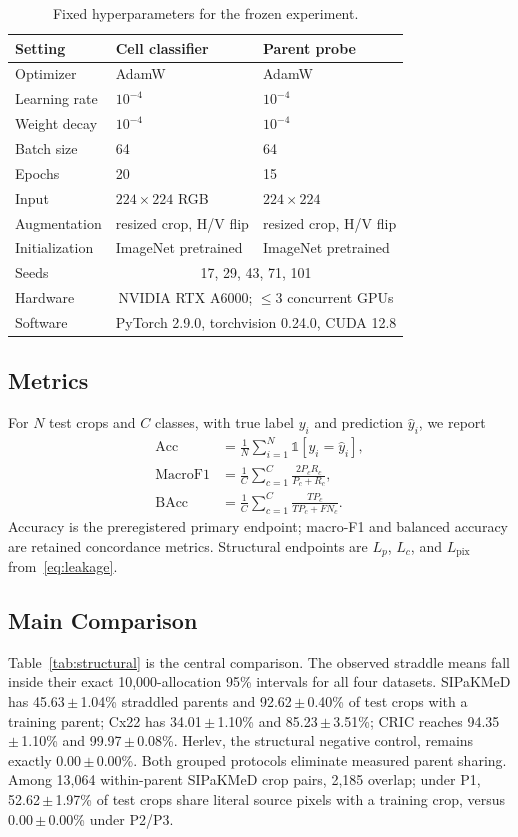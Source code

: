 \documentclass[conference]{IEEEtran}
\newcommand{\meanpm}[2]{#1\,$\pm$\,#2}
\newcommand{\protocol}[1]{\textsf{#1}}
\begin{document}
\begin{table}[t]
\caption{Fixed hyperparameters for the frozen experiment.}
\label{tab:hparams}
\centering
\scriptsize
\setlength{\tabcolsep}{3.5pt}
\begin{tabular}{lll}
\toprule
Setting & Cell classifier & Parent probe \\
\midrule
Optimizer & AdamW & AdamW \\
Learning rate & $10^{-4}$ & $10^{-4}$ \\
Weight decay & $10^{-4}$ & $10^{-4}$ \\
Batch size & 64 & 64 \\
Epochs & 20 & 15 \\
Input & $224\times224$ RGB & $224\times224$ \\
Augmentation & resized crop, H/V flip & resized crop, H/V flip \\
Initialization & ImageNet pretrained & ImageNet pretrained \\
Seeds & \multicolumn{2}{c}{17, 29, 43, 71, 101} \\
Hardware & \multicolumn{2}{c}{NVIDIA RTX A6000; $\leq$3 concurrent GPUs} \\
Software & \multicolumn{2}{c}{PyTorch 2.9.0, torchvision 0.24.0, CUDA 12.8} \\
\bottomrule
\end{tabular}
\end{table}

\subsection{Metrics}
For $N$ test crops and $C$ classes, with true label $y_i$ and prediction $\hat y_i$, we report
\begin{align}
\mathrm{Acc}&=\frac{1}{N}\sum_{i=1}^{N}\mathbb{1}[y_i=\hat y_i],\\
\mathrm{MacroF1}&=\frac{1}{C}\sum_{c=1}^{C}\frac{2P_cR_c}{P_c+R_c},\\
\mathrm{BAcc}&=\frac{1}{C}\sum_{c=1}^{C}\frac{TP_c}{TP_c+FN_c}.
\end{align}
Accuracy is the preregistered primary endpoint; macro-F1 and balanced accuracy are retained concordance metrics.
Structural endpoints are $L_p$, $L_c$, and $L_{\mathrm{pix}}$ from~\eqref{eq:leakage}.

\subsection{Main Comparison}
Table~\ref{tab:structural} is the central comparison.
The observed straddle means fall inside their exact 10,000-allocation 95\% intervals for all four datasets.
SIPaKMeD has \meanpm{45.63}{1.04}\% straddled parents and \meanpm{92.62}{0.40}\% of test crops with a training parent; Cx22 has \meanpm{34.01}{1.10}\% and \meanpm{85.23}{3.51}\%; CRIC reaches \meanpm{94.35}{1.10}\% and \meanpm{99.97}{0.08}\%.
Herlev, the structural negative control, remains exactly \meanpm{0.00}{0.00}\%.
Both grouped protocols eliminate measured parent sharing.
Among 13,064 within-parent SIPaKMeD crop pairs, 2,185 overlap; under \protocol{P1}, \meanpm{52.62}{1.97}\% of test crops share literal source pixels with a training crop, versus \meanpm{0.00}{0.00}\% under \protocol{P2}/\protocol{P3}.
\end{document}
